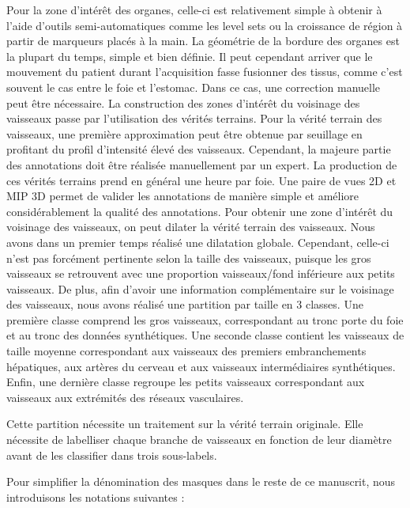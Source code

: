 Pour la zone d'intérêt des organes, celle-ci est relativement simple à obtenir à l'aide d'outils semi-automatiques comme les level sets ou la croissance de région à partir de marqueurs placés à la main. La géométrie de la bordure des organes est la plupart du temps, simple et bien définie. Il peut cependant arriver que le mouvement du patient durant l'acquisition fasse fusionner des tissus, comme c'est souvent le cas entre le foie et l'estomac. Dans ce cas, une correction manuelle peut être nécessaire.
La construction des zones d'intérêt du voisinage des vaisseaux passe par l'utilisation des vérités terrains.
Pour la vérité terrain des vaisseaux, une première approximation peut être obtenue par seuillage en profitant du profil d'intensité élevé des vaisseaux. Cependant, la majeure partie des annotations doit être réalisée manuellement par un expert. La production de ces vérités terrains prend en général une heure par foie. Une paire de vues 2D et MIP 3D permet de valider les annotations de manière simple et améliore considérablement la qualité des annotations.
Pour obtenir une zone d'intérêt du voisinage des vaisseaux, on peut dilater la vérité terrain des vaisseaux. Nous avons dans un premier temps réalisé une dilatation globale. Cependant, celle-ci n'est pas forcément pertinente selon la taille des vaisseaux, puisque les gros vaisseaux se retrouvent avec une proportion vaisseaux/fond inférieure aux petits vaisseaux. De plus, afin d'avoir une information complémentaire sur le voisinage des vaisseaux, nous avons réalisé une partition par taille en 3 classes. Une première classe comprend les gros vaisseaux, correspondant au tronc porte du foie et au tronc des données synthétiques. Une seconde classe contient les vaisseaux de taille moyenne correspondant aux vaisseaux des premiers embranchements hépatiques, aux artères du cerveau et aux vaisseaux intermédiaires synthétiques. Enfin, une dernière classe regroupe les petits vaisseaux correspondant aux vaisseaux aux extrémités des réseaux vasculaires.

Cette partition nécessite un traitement sur la vérité terrain originale. Elle nécessite de labelliser chaque branche de vaisseaux en fonction de leur diamètre avant de les classifier dans trois sous-labels.

Pour simplifier la dénomination des masques dans le reste de ce manuscrit, nous introduisons les notations suivantes :

